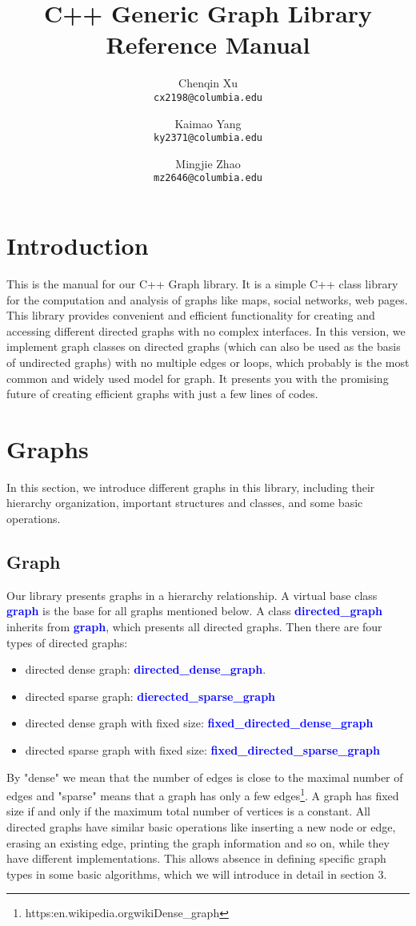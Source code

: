 \documentclass[]{article}
\title{C++ Generic Graph Library Reference Manual}
\author{Chenqin Xu\\
	{\tt\small cx2198@columbia.edu}
	\and
	Kaimao Yang\\
	{\tt\small ky2371@columbia.edu}
	\and
	Mingjie Zhao\\
	{\tt\small mz2646@columbia.edu}
}
\begin{document}
\maketitle

\tableofcontents
\newpage
\section{Introduction}
This is the manual for our C++ Graph library. It is a simple C++ class library for the computation and analysis of graphs like maps, social networks, web pages. This library provides convenient and efficient functionality for creating and accessing different directed graphs with no complex interfaces. In this version, we implement graph classes on directed graphs (which can also be used as the basis of undirected graphs) with no multiple edges or loops, which probably is the most common and widely used model for graph. It presents you with the promising future of creating efficient graphs with just a few lines of codes.

\section {Graphs}
In this section, we introduce different graphs in this library, including their hierarchy organization, important structures and classes, and some basic operations.
\subsection{Graph}
Our library presents graphs in a hierarchy relationship. A virtual base class \textbf{\textcolor{blue}{graph}} is the base for all graphs mentioned below. A class \textbf{\textcolor{blue}{directed\_graph}} inherits from \textbf{\textcolor{blue}{graph}}, which presents all directed graphs. Then there are four types of directed graphs:
\begin{itemize}
	\item directed dense graph: \textbf{\textcolor{blue}{directed\_dense\_graph}}.
	\item directed sparse graph: \textbf{\textcolor{blue}{dierected\_sparse\_graph}}
	\item directed dense graph with fixed size: \textbf{\textcolor{blue}{fixed\_directed\_dense\_graph}}
	\item directed sparse graph with fixed size: \textbf{\textcolor{blue}{fixed\_directed\_sparse\_graph}}
\end{itemize}
By "dense" we mean that the number of edges is close to the maximal number of edges and "sparse" means that a graph has only a few edges\footnote{https:\/\/en.wikipedia.org\/wiki\/Dense\_graph}. A graph has fixed size if and only if the maximum total number of vertices is a constant.
All directed graphs have similar basic operations like inserting a new node or edge, erasing an existing edge, printing the graph information and so on, while they have different implementations. This allows absence in defining specific graph types in some basic algorithms, which we will introduce in detail in section 3.
\end{document}
